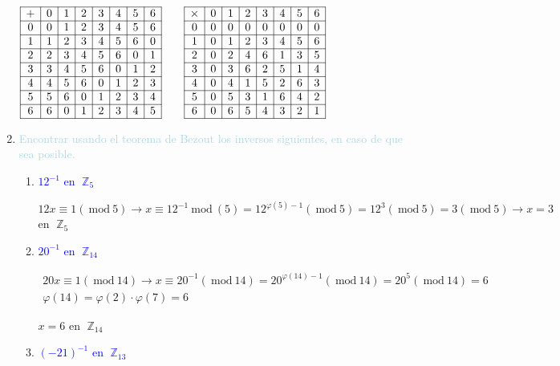 \documentclass[12pt]{article}
\newcommand{\lb}[1]{\textcolor{lightblue}{#1}}
\newcommand{\db}[1]{\textcolor{blue}{#1}}
\DeclareMathOperator{\Z}{\mathbb{Z}}
\renewcommand{\mod}{~\mathrm{mod}~}
\begin{document}
\begin{enumerate}[label=\color{red}\textbf{\arabic*)}, leftmargin=*]
	$\begin{array}{|c|c|c|c|c|c|c|c|}
		\hline
		+ & 0 & 1 & 2 & 3 & 4 & 5 & 6 \\ \hline
		0 & 0 & 1 & 2 & 3 & 4 & 5 & 6 \\ \hline
		1 & 1 & 2 & 3 & 4 & 5 & 6 & 0 \\ \hline
		2 & 2 & 3 & 4 & 5 & 6 & 0 & 1 \\ \hline
		3 & 3 & 4 & 5 & 6 & 0 & 1 & 2 \\ \hline
		4 & 4 & 5 & 6 & 0 & 1 & 2 & 3 \\ \hline
		5 & 5 & 6 & 0 & 1 & 2 & 3 & 4 \\ \hline
		6 & 6 & 0 & 1 & 2 & 3 & 4 & 5 \\ \hline
	\end{array}\qquad\begin{array}{|c|c|c|c|c|c|c|c|}
	\hline
	\times & 0 & 1 & 2 & 3 & 4 & 5 & 6 \\ \hline
	0 & 0 & 0 & 0 & 0 & 0 & 0 & 0 \\ \hline
	1 & 0 & 1 & 2 & 3 & 4 & 5 & 6 \\ \hline
	2 & 0 & 2 & 4 & 6 & 1 & 3 & 5 \\ \hline
	3 & 0 & 3 & 6 & 2 & 5 & 1 & 4 \\ \hline
	4 & 0 & 4 & 1 & 5 & 2 & 6 & 3 \\ \hline
	5 & 0 & 5 & 3 & 1 & 6 & 4 & 2 \\ \hline
	6 & 0 & 6 & 5 & 4 & 3 & 2 & 1\\ \hline
	\end{array}$
	\item \lb{Encontrar usando el teorema de Bezout los inversos siguientes, en caso de que sea posible.}
	\begin{enumerate}[label=\color{red}\alph*)]
		\item \db{$12^{-1}$ en $\Z_5$}
		
		$12x\equiv1(\mod5)\longrightarrow x\equiv12^{-1}\mod(5)=12^{\varphi(5)-1}(\mod 5)=12^{3}(\mod5)=3(\mod5)\longrightarrow x=3$ en $\Z_5$
		\item \db{$20^{-1}$ en $\Z_{14}$}
		
		$\begin{array}{l}
			20x\equiv1(\mod14)\longrightarrow x\equiv20^{-1}(\mod14)=20^{\varphi(14)-1}(\mod14)=20^5(\mod14)=6\\
			\varphi(14)=\varphi(2)\cdot\varphi(7)=6
		\end{array}$
		
		$x=6$ en $\Z_{14}$
		\item \db{$(-21)^{-1}$ en $\Z_{13}$}
		

\end{enumerate}
\end{enumerate}
\end{document}
